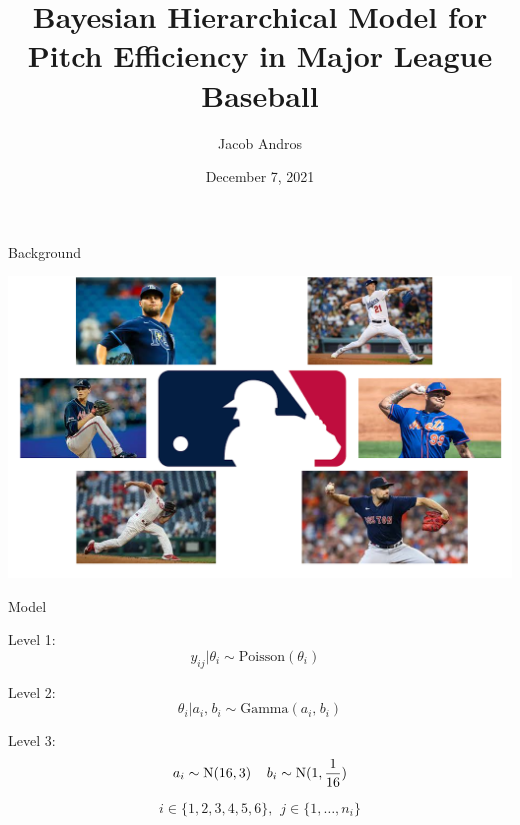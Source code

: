 \documentclass[xcolor=dvipsnames]{beamer}
\title[Pitch Efficiency]{Bayesian Hierarchical Model for Pitch Efficiency in Major League Baseball}
\author{Jacob Andros}
\date{December 7, 2021}
\begin{document}
\maketitle


\begin{frame}{Background}

\includegraphics[scale=0.63]{figs/pitchers.PNG}

\end{frame}


\begin{frame}{Model}

\noindent Level 1:
\begin{equation}
    y_{ij} | \theta_i \sim \text{Poisson}(\theta_i) \hspace{8pt}
    \label{eq:lv1}
\end{equation}

\noindent Level 2:
\begin{equation}
    \theta_i | a_i, \hspace{1pt} b_i \sim \text{Gamma}(a_i, \hspace{1pt} b_i)
    \label{eq:lv2}
\end{equation}

\noindent Level 3:
\begin{equation}
    a_i \sim \text{N}(16, 3) \hspace{.4cm} b_i \sim \text{N}(1, \frac{1}{16})
    \label{eq:lv3}
\end{equation}

\vspace{0.6cm}
$$
i \in \{1,2,3,4,5,6\}, \hspace{5pt} j \in \{1,\hdots,n_i\}
$$


\end{frame}
\end{document}
